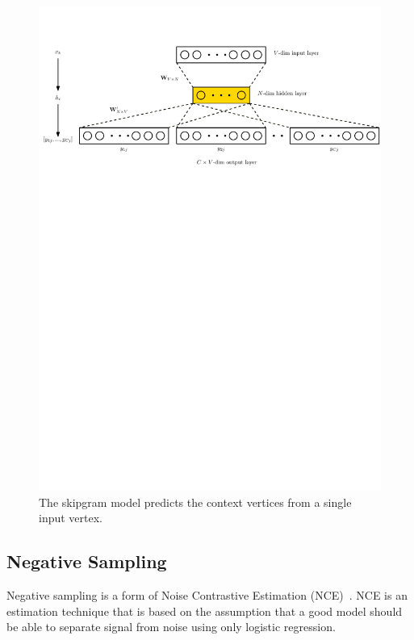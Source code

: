 \documentclass[sigconf, review]{acmart}
\begin{document}
 \begin{figure}
 \begin{center}
    \includegraphics[width=\hsize]{skipgram}
  \end{center}
  \caption{The skipgram model predicts the context vertices from a single input vertex.}
  \label{fig:skipgram}
\end{figure}

\subsection{Negative Sampling}

Negative sampling is a form of Noise Contrastive Estimation (NCE)~\cite{Gutmann2012}. NCE is an estimation technique that is based on the assumption that a good model should be able to separate signal from noise using only logistic regression. 
\end{document}
